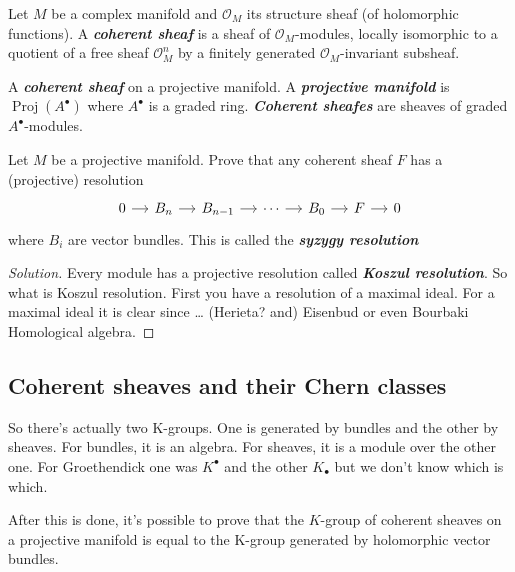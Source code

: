 \begin{defn}
	Let $M$ be a complex manifold and $\mathcal{O}_{M}$ its structure sheaf (of holomorphic functions). A \textit{\textbf{coherent sheaf}} is a sheaf of $\mathcal{O}_{M}$-modules, locally isomorphic to a quotient of a free sheaf $\mathcal{O}^n_{M}$ by a finitely generated  $\mathcal{O}_{M}$-invariant subsheaf.

	A \textit{\textbf{coherent sheaf}} on a projective manifold. A \textit{\textbf{projective manifold}} is  $\operatorname{Proj}(A^\bullet) $ where $A^\bullet$ is a graded ring. \textit{\textbf{Coherent sheafes}} are sheaves of graded $A^\bullet$-modules.
\end{defn}

\begin{exercise}
	Let $M$ be a projective manifold. Prove that any coherent sheaf $F$ has a (projective) resolution
	\[\begin{tikzcd}[column sep=small]
		0\arrow[r]&B_{n}\arrow[r]&B_{n-1}\arrow[r]&\cdots \arrow[r]&B_0\arrow[r]&F\arrow[r]&0
	\end{tikzcd}\]
	where $B_i$ are vector bundles. This is called the \textit{\textbf{syzygy resolution}}
\end{exercise}

\begin{proof}[Solution]\leavevmode
	Every module has a projective resolution called \textit{\textbf{Koszul resolution}}. So what is Koszul resolution. First you have a resolution of a maximal ideal. For a maximal ideal it is clear since … (Herieta? and) Eisenbud or even Bourbaki Homological algebra.
\end{proof}

\subsection{Coherent sheaves and their Chern classes}


So there's actually two K-groups. One is generated by bundles and the other by sheaves. For bundles, it is an algebra. For sheaves, it is a module over the other one. For Groethendick one was $K^\bullet$ and the other $K_{\bullet}$ but we don't know which is which.

\begin{remark}
	After this is done, it's possible to prove that the $K$-group of coherent sheaves on a projective manifold is equal to the K-group generated by holomorphic vector bundles.
\end{remark}

